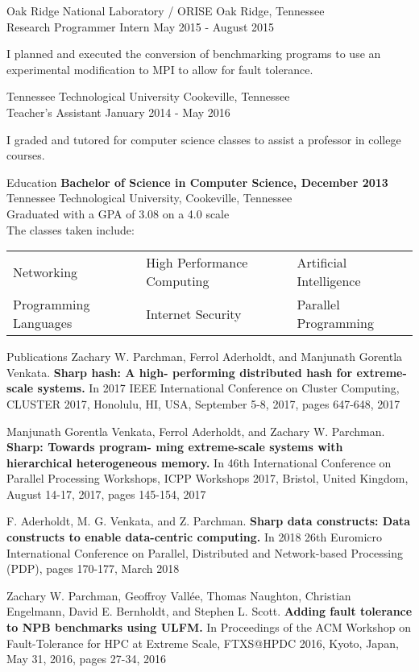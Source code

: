 \documentclass{res}
\newcommand{\job}[5]{ 
\begin{bf}
#3 \hfill #4 \\
#1 \hfill #2 \\
\end{bf}
#5
}
\begin{document}
\begin{resume}
\job{Research Programmer Intern} 
{May 2015 - August 2015}
{Oak Ridge National Laboratory / ORISE}
{Oak Ridge, Tennessee}
{
    I planned and executed the conversion of benchmarking programs to use an
    experimental modification to MPI to allow for fault tolerance.
}

\job{Teacher's Assistant} {January 2014 - May 2016}
{Tennessee Technological University}
{Cookeville, Tennessee}
{
    I graded and tutored for computer science classes to assist a professor in
    college courses.
}

\begin{section}{Education}
    {\bf Bachelor of Science in Computer Science, December 2013}\\
    Tennessee Technological University, Cookeville, Tennessee\\
    Graduated with a GPA of 3.08 on a 4.0 scale \\
    The classes taken include:\\
        \begin{tabularx}{\textwidth}{@{} X X X}
            Networking & High Performance Computing & Artificial Intelligence \\
            Programming Languages & Internet Security & Parallel Programming  \\
        \end{tabularx}
\end{section}

\begin{section}{Publications}
Zachary W. Parchman, Ferrol Aderholdt, and Manjunath Gorentla Venkata. {\bf Sharp hash: A high-
performing distributed hash for extreme-scale systems.} In 2017 IEEE International Conference on
Cluster Computing, CLUSTER 2017, Honolulu, HI, USA, September 5-8, 2017, pages 647-648, 2017

Manjunath Gorentla Venkata, Ferrol Aderholdt, and Zachary W. Parchman. {\bf Sharp: Towards program-
ming extreme-scale systems with hierarchical heterogeneous memory.} In 46th International Conference
on Parallel Processing Workshops, ICPP Workshops 2017, Bristol, United Kingdom, August 14-17,
2017, pages 145-154, 2017

F. Aderholdt, M. G. Venkata, and Z. Parchman. {\bf Sharp data constructs: Data constructs to enable
data-centric computing.} In 2018 26th Euromicro International Conference on Parallel, Distributed and
Network-based Processing (PDP), pages 170-177, March 2018


Zachary W. Parchman, Geoffroy Vallée, Thomas Naughton, Christian Engelmann, David E. Bernholdt,
and Stephen L. Scott. {\bf Adding fault tolerance to NPB benchmarks using ULFM.} In Proceedings of
the ACM Workshop on Fault-Tolerance for HPC at Extreme Scale, FTXS@HPDC 2016, Kyoto, Japan,
May 31, 2016, pages 27-34, 2016
\end{section}


\end{resume}
\end{document}
